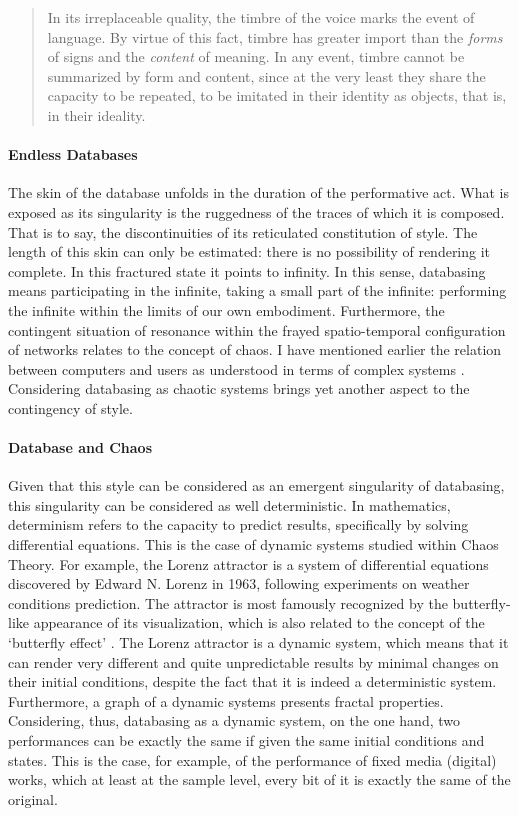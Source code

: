 \begin{quote}
	In its irreplaceable quality, the timbre of the voice marks the event of language. By virtue of this fact, timbre has greater import than the \textit{forms} of signs and the \textit{content} of meaning. In any event, timbre cannot be summarized by form and content, since at the very least they share the capacity to be repeated, to be imitated in their identity as objects, that is, in their ideality. \parencite[296]{Der82:Mar}
\end{quote}

\paragraph{Endless Databases}
The skin of the database unfolds in the duration of the performative act. What is exposed as its singularity is the ruggedness of the traces of which it is composed. That is to say, the discontinuities of its reticulated constitution of style. The length of this skin can only be estimated: there is no possibility of rendering it complete. In this fractured state it points to infinity. In this sense, databasing means participating in the infinite, taking a small part of the infinite: performing the infinite within the limits of our own embodiment. Furthermore, the contingent situation of resonance within the frayed spatio-temporal configuration of networks relates to the concept of chaos. I have mentioned earlier the relation between computers and users as understood in terms of complex systems . Considering databasing as chaotic systems brings yet another aspect to the contingency of style. 

\paragraph{Database and Chaos}
Given that this style can be considered as an emergent singularity of databasing, this singularity can be considered as well deterministic. In mathematics, determinism refers to the capacity to predict results, specifically by solving differential equations. This is the case of dynamic systems studied within Chaos Theory. For example, the Lorenz attractor is a system of differential equations discovered by Edward N. Lorenz in 1963, following experiments on weather conditions prediction. The attractor is most famously recognized by the butterfly-like appearance of its visualization, which is also related to the concept of the `butterfly effect' . The Lorenz attractor is a dynamic system, which means that it can render very different and quite unpredictable results by minimal changes on their initial conditions, despite the fact that it is indeed a deterministic system. Furthermore, a graph of a dynamic systems presents fractal properties. Considering, thus, databasing as a dynamic system, on the one hand, two performances can be exactly the same if given the same initial conditions and states. This is the case, for example, of the performance of fixed media (digital) works, which at least at the sample level, every bit of it is exactly the same of the original. 

